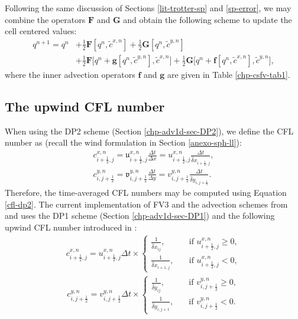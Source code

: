 Following the same discussion of Sections \ref{lit-trotter-sp} and  \ref{sp-error}, we may combine the operators $\mathbf{F}$ and $\mathbf{G}$ and
obtain the following scheme to update the cell centered values:
\begin{align}
	\label{q-split}
	q^{n+1} = q^n &+ \frac{1}{2}\mathbf{F}[q^n,\tilde{c}^{x,n}] + \frac{1}{2}\mathbf{G}[q^n,\tilde{c}^{y,n}]\nonumber \\
	&+\frac{1}{2}\mathbf{F}\bigg[q^n + \mathbf{g}[q^n, \tilde{c}^{y,n}], \tilde{c}^{x,n}\bigg]+
	\frac{1}{2}\mathbf{G}\bigg[q^n + \mathbf{f}[q^n, \tilde{c}^{x,n}], \tilde{c}^{y,n}\bigg],
\end{align}
where the inner advection operators $\mathbf{f}$ and $\mathbf{g}$ are given in Table \ref{chp-csfv-tab1}.

\subsection{The upwind CFL number}
\label{sec-cfl}
When using the DP2 scheme (Section \ref{chp-adv1d-sec-DP2}), we define the CFL number as (recall the wind formulation in Section \ref{anexo-sph-ll}):
\begin{align}
	\label{cfl_dp2-x}
	{c}_{i+\frac{1}{2},j}^{x,n} = {\mathfrak{u}}_{i+\frac{1}{2},j}^{x,n}\frac{\Delta t}{\Delta x}
	= {{u}}_{i+\frac{1}{2},j}^{x,n}\frac{\Delta t}{\hat{\delta} x_{i+\frac{1}{2},j}},\\
	\label{cfl_dp2-y}
	{c}_{i,j+\frac{1}{2}}^{y,n} = {\mathfrak{v}}_{i,j+\frac{1}{2}}^{y,n}\frac{\Delta t}{\Delta y}
	= {{v}}_{i,j+\frac{1}{2}}^{y,n}\frac{\Delta t}{\hat{\delta} y_{i,j+\frac{1}{2}}}.
\end{align}
Therefore, the time-averaged CFL numbers may be computed using Equation \eqref{cfl-dp2}.
The current implementation of FV3 and the advection schemes from \citet{lin:2004} and \citet{putman:2007}
uses the DP1 scheme (Section \ref{chp-adv1d-sec-DP1}) and the following upwind CFL number introduced in \citet{lin:1994}:
\begin{align}
	\label{cfl_dp1-x}
{c}_{i+\frac{1}{2},j}^{x,n} ={{u}}_{i+\frac{1}{2},j}^{x,n}{\Delta t} \times
	\begin{cases}
       \frac{1}{\hat{\delta} x_{ij}},
        \quad &\text{if }{{{u}}_{i+\frac{1}{2},j}^{x,n} \ge 0},\\
       \frac{1}{\hat{\delta} x_{i+1,j}}, 
	 	\quad &\text{if }{{{u}}_{i+\frac{1}{2},j}^{x,n} < 0},
	\end{cases}
\end{align}
\begin{align}
	\label{cfl_dp1-y}
	{c}_{i,j+\frac{1}{2}}^{y,n} = {{v}}_{i,j+\frac{1}{2}}^{y,n}{\Delta t} \times
	\begin{cases}
		\frac{1}{\hat{\delta} y_{ij}},
		\quad &\text{if }{{{v}}_{i,j+\frac{1}{2}}^{y,n} \ge 0},\\
		\frac{1}{\hat{\delta} y_{i,j+1}},
		\quad &\text{if }{{{v}}_{i,j+\frac{1}{2}}^{y,n} < 0}.
	\end{cases}
\end{align}
